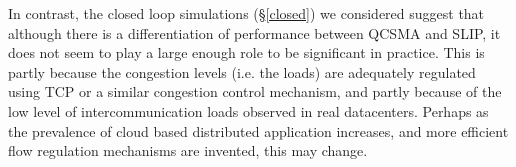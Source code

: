 \documentclass{IEEEtran}%
\begin{document}
In contrast, the closed loop simulations (\S \ref{closed}) we considered suggest that although there is a differentiation of performance between QCSMA and SLIP, it does not seem to play a large enough role to be significant in practice.  This is partly because the congestion levels (i.e. the loads) are adequately regulated using TCP or a similar congestion control mechanism, and partly because of the low level of intercommunication loads observed in real datacenters.  Perhaps as the prevalence of cloud based distributed application increases, and more efficient flow regulation mechanisms are invented, this may change.



\end{document}
